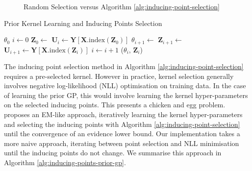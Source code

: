 \documentclass{article}
\numberwithin{equation}{section}
\begin{document}
\begin{figure}[h!]
\begin{minipage}{.25\textwidth}
\end{minipage}%
\caption{Random Selection versus Algorithm \ref{alg:inducing-point-selection}}\label{fig:inducing-point-algo}
\end{figure}

\begin{algorithm}[h!]
\caption{Prior Kernel Learning and Inducing Points Selection}\label{alg:inducing-points-prior-gp}
\begin{algorithmic}
\Require $\theta_0$ 
 \State $i \leftarrow 0$
  \State $\mathbf{Z}_0 \leftarrow$  
  \State $\mathbf{U}_i \leftarrow \mathbf{Y}\left[\mathbf{X}.\text{index}\left(\mathbf{Z}_0\right)\right]$ 
\State $\theta_{i+1} \leftarrow$  
\State $\mathbf{Z}_{i+1} \leftarrow$ 
\State $\mathbf{U}_{i+1} \leftarrow \mathbf{Y}\left[\mathbf{X}.\text{index}\left(\mathbf{Z}_i\right)\right]$
\State $i \leftarrow i+1$
\EndWhile
\State \Return ($\theta_i$, $\mathbf{Z}_i$)
\end{algorithmic}
\end{algorithm}


The inducing point selection method in Algorithm \ref{alg:inducing-point-selection} requires a pre-selected kernel.
However in practice, kernel selection generally involves negative log-likelihood (NLL) optimisation on training data.
In the case of learning the prior GP, this would involve learning the kernel hyper-parameters on the selected inducing points.
This presents a chicken and egg problem.
\cite{burt2020convergence} proposes an EM-like approach, iteratively learning the kernel hyper-parameters and selecting the inducing points with Algorithm \ref{alg:inducing-point-selection} until the convergence of an evidence lower bound.
Our implementation takes a more naive approach, iterating between point selection and NLL minimisation until the inducing points do not change. 
We summarise this approach in Algorithm \ref{alg:inducing-points-prior-gp}.
\end{document}
